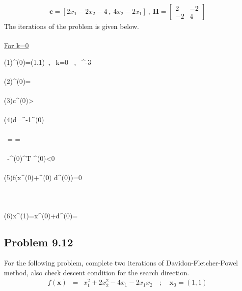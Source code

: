 \documentclass[]{report}
\begin{document}
\begin{eqnarray*}
\mathbf{c}=\left[2x_1-2x_2-4 \ , \ 4x_2-2x_1\right] \ , \ \mathbf{H}=\left[\begin{array}{cc}
2 & -2 \\
-2 & 4\end{array}\right]
\end{eqnarray*}
The iterations of the problem is given below.\\~\\
\underline{For k=0}
\begin{program}
\left(1\right)\quad {}^{(0)}=\left(1,1\right)\ , \, k=0 \ , \ ^{-3}\\~ \\
\left(2\right)\quad {}^{(0)}=\left[-4 \ , \ 2\right]\\~  \\
\left(3\right)\quad \lvert \mathbf c^{(0)}>\epsilon\\~  \\
\left(4\right)\quad \mathbf d=^{-1}^{(0)}\\~  \\
\quad \quad \quad \ = \left[\begin{array}{cc}1 & 0.5 \\ 0.5 & 0.5 \end{array}\right]\left[\begin{array}{c}-4 \\ 2\end{array}\right]=\left[\begin{array}{c}-3 \\ -1\end{array}\right]\\~  \\
\quad \quad \quad \ -{^{(0)}}^{\mathrm T} ^{(0)}<0 \Longrightarrow {} \\~\\
\left(5\right)\quad \delta f\left(\mathbf x^{(0)}+\alpha^{(0)} \mathbf d^{(0)}\right)=0\\~\\
\quad \quad \quad {}\\~\\
\left(6\right)\quad \mathbf x^{(1)}=\mathbf x^{(0)}+\mathbf d^{(0)}=\left[4\ , \ 2\right]
\end{program}
\subsection*{Problem 9.12}
For the following problem, complete two iterations of Davidon-Fletcher-Powel method, also check descent condition for the search direction.
\begin{eqnarray*}
f\left(\mathbf x\right)&=&x_1^2+2x_2^2-4x_1-2x_1x_2 \quad ; \quad \mathbf{x}_0=\left(1,1\right)
\end{eqnarray*}
\end{document}
